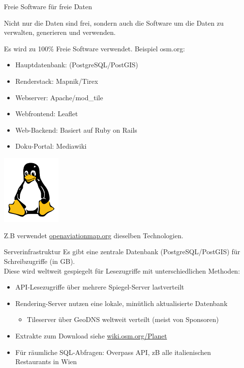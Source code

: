 \documentclass{beamer}
\begin{document}
\begin{frame}{Freie Software für freie Daten}

Nicht nur die Daten sind frei, sondern auch die Software um die Daten zu verwalten, generieren und verwenden.

\vspace{0.6cm}

Es wird zu 100\% Freie Software verwendet. Beispiel osm.org:
\begin{itemize}
  \item Hauptdatenbank: (PostgreSQL/PostGIS)
  \item Renderstack: Mapnik/Tirex
  \item Webserver: Apache/mod\_tile
  \item Webfrontend: Leaflet
  \item Web-Backend: Basiert auf Ruby on Rails
  \item Doku-Portal: Mediawiki
\end{itemize}


  \vspace*{-3cm}
 \hfill \includegraphics[width=3cm]{tux.png}


\pause

Z.B verwendet \href{http://openaviationmap.org/}{openaviationmap.org} dieselben Technologien.

\end{frame}

\begin{frame}{Serverinfrastruktur}
Es gibt eine zentrale Datenbank (PostgreSQL/PostGIS) für Schreibzugriffe (in GB).\\
\pause
Diese wird weltweit gespiegelt für Lesezugriffe mit unterschiedlichen Methoden:

\begin{itemize}
  \item API-Lesezugriffe über mehrere Spiegel-Server lastverteilt
  \item Rendering-Server nutzen eine lokale, minütlich aktualisierte Datenbank
  \begin{itemize}
    \item Tileserver über GeoDNS weltweit verteilt (meist von Sponsoren)
  \end{itemize}
  \item Extrakte zum Download siehe \href{http://wiki.osm.org/Planet}{wiki.osm.org/Planet}
  \item Für räumliche SQL-Abfragen: Overpass API, zB alle italienischen Restaurants in Wien
\end{itemize}

\end{frame}
\end{document}
